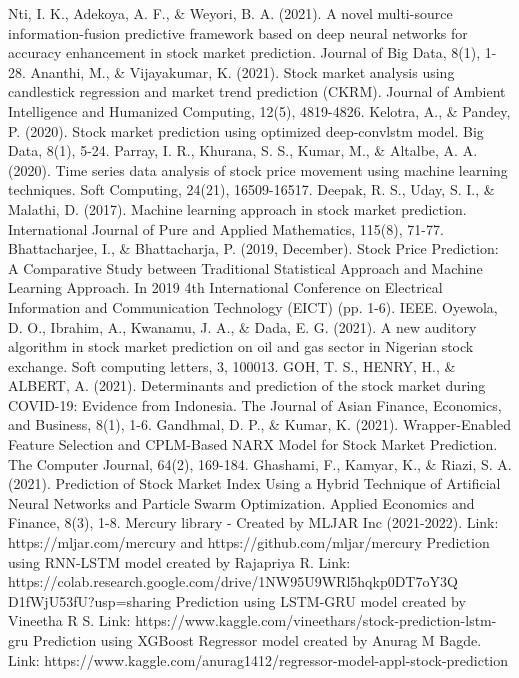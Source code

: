 \documentclass[conference]{IEEEtran}
\begin{document}
\begin{thebibliography}{00}
 Nti, I. K., Adekoya, A. F., \& Weyori, B. A. (2021). A novel multi-source information-fusion predictive framework based on deep neural networks for accuracy enhancement in stock market prediction. Journal of Big Data, 8(1), 1-28.
 Ananthi, M., \& Vijayakumar, K. (2021). Stock market analysis using candlestick regression and market trend prediction (CKRM). Journal of Ambient Intelligence and Humanized Computing, 12(5), 4819-4826.
 Kelotra, A., \& Pandey, P. (2020). Stock market prediction using optimized deep-convlstm model. Big Data, 8(1), 5-24.
 Parray, I. R., Khurana, S. S., Kumar, M., \& Altalbe, A. A. (2020). Time series data analysis of stock price movement using machine learning techniques. Soft Computing, 24(21), 16509-16517.
 Deepak, R. S., Uday, S. I., \& Malathi, D. (2017). Machine learning approach in stock market prediction. International Journal of Pure and Applied Mathematics, 115(8), 71-77. 
 Bhattacharjee, I., \& Bhattacharja, P. (2019, December). Stock Price Prediction: A Comparative Study between Traditional Statistical Approach and Machine Learning Approach. In 2019 4th International Conference on Electrical Information and Communication Technology (EICT) (pp. 1-6). IEEE.
 Oyewola, D. O., Ibrahim, A., Kwanamu, J. A., \& Dada, E. G. (2021). A new auditory algorithm in stock market prediction on oil and gas sector in Nigerian stock exchange. Soft computing letters, 3, 100013.
 GOH, T. S., HENRY, H., \& ALBERT, A. (2021). Determinants and prediction of the stock market during COVID-19: Evidence from Indonesia. The Journal of Asian Finance, Economics, and Business, 8(1), 1-6.
 Gandhmal, D. P., \& Kumar, K. (2021). Wrapper-Enabled Feature Selection and CPLM-Based NARX Model for Stock Market Prediction. The Computer Journal, 64(2), 169-184.
 Ghashami, F., Kamyar, K., \& Riazi, S. A. (2021). Prediction of Stock Market Index Using a Hybrid Technique of Artificial Neural Networks and Particle Swarm Optimization. Applied Economics and Finance, 8(3), 1-8.
 Mercury library - Created by MLJAR Inc (2021-2022). Link: https://mljar.com/mercury and https://github.com/mljar/mercury
 Prediction using RNN-LSTM model created by Rajapriya R. Link: https://colab.research.google.com/drive/1NW95U9WRl5hqkp0DT7oY3Q
D1fWjU53fU?usp=sharing
 Prediction using LSTM-GRU model created by Vineetha R S. Link: https://www.kaggle.com/vineethars/stock-prediction-lstm-gru
 Prediction using XGBoost Regressor model created by Anurag M Bagde. Link: https://www.kaggle.com/anurag1412/regressor-model-appl-stock-prediction

\end{thebibliography}
\vspace{12pt}
\end{document}
